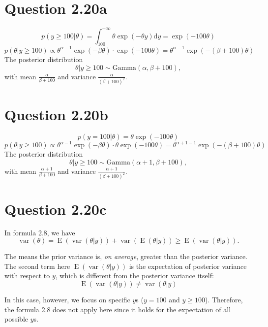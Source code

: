 \documentclass{article}
\DeclareMathOperator*{\var}{var}
\DeclareMathOperator*{\expec}{E}
\begin{document}
\section*{Question 2.20a}
{
    $$p(y\geq 100 | \theta) = \int_{100}^{+\infty} {\theta \exp{(-\theta y)} \mathrm{d}y} = \exp{(-100\theta)}$$
    $$p(\theta | y\geq 100) \propto \theta^{\alpha-1} \exp{(-\beta \theta)} \cdot \exp{(-100\theta)} = \theta^{\alpha-1} \exp{(-(\beta+100)\theta)}$$
    The posterior distribution $$\theta | y\geq 100 \sim \mathrm{Gamma}(\alpha, \beta+100),$$ with mean $\frac{\alpha}{\beta+100}$ and variance $\frac{\alpha}{(\beta+100)^2}$.
}

\section*{Question 2.20b}
{
    $$p(y=100 | \theta) = \theta \exp{(-100\theta)}$$
    $$p(\theta | y\geq 100) \propto \theta^{\alpha-1} \exp{(-\beta \theta)} \cdot \theta\exp{(-100\theta)} = \theta^{\alpha+1-1} \exp{(-(\beta+100)\theta)}$$
    The posterior distribution $$\theta | y\geq 100 \sim \mathrm{Gamma}(\alpha+1, \beta+100),$$ with mean $\frac{\alpha+1}{\beta+100}$ and variance $\frac{\alpha+1}{(\beta+100)^2}$.
}

\section*{Question 2.20c}
{
    In formula 2.8, we have $$\var{(\theta)} = \expec{(\var{(\theta|y)})} + \var{(\expec{(\theta|y)})} \geq \expec{(\var{(\theta|y)})}.$$
    
    The means the prior variance is, \emph{on average}, greater than the posterior variance. The second term here $\expec{(\var{(\theta|y)})}$ is the expectation of posterior variance with respect to $y$, which is different from the posterior variance itself:
    $$\expec{(\var{(\theta|y)})} \neq \var{(\theta|y)}$$

    In this case, however, we focus on specific $y$s ($y=100$ and $y\geq 100$). Therefore, the formula 2.8 does not apply here since it holds for the expectation of all possible $y$s.
}

\clearpage
\end{document}
